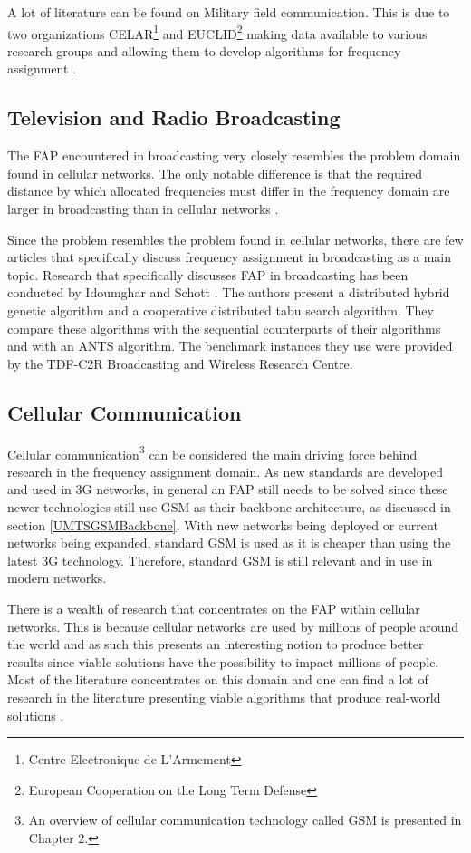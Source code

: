 A lot of literature can be found on Military field communication. This is due to two organizations CELAR\footnote{Centre Electronique de L'Armement} and EUCLID\footnote{European Cooperation on the Long Term Defense} making data available to various research groups and allowing them to develop algorithms for frequency assignment \cite{CALMA,DynamicFAP}. 

\subsection{Television and Radio Broadcasting}
The FAP encountered in broadcasting very closely resembles the problem domain found in cellular networks. The only notable difference is that the required distance by which allocated frequencies must differ in the frequency domain are larger in broadcasting than in cellular networks \cite{Karen2004}.

Since the problem resembles the problem found in cellular networks, there are few articles that specifically discuss frequency assignment in broadcasting as a main topic. Research that specifically discusses FAP in broadcasting has been conducted by Idoumghar and Schott \cite{RadioFAP}. The authors present a distributed hybrid genetic algorithm and a cooperative distributed tabu search algorithm. They compare these algorithms with the sequential counterparts of their algorithms and with an ANTS algorithm. The benchmark instances they use were provided by the TDF-C2R Broadcasting and Wireless Research Centre.
\subsection{Cellular Communication}
Cellular communication\footnote{An overview of cellular communication technology called GSM is presented in Chapter 2.} can be considered the main driving force behind research in the frequency assignment domain. As new standards are developed and used in 3G networks, in general an FAP still needs to be solved since these newer technologies still use GSM as their backbone architecture, as discussed in section \ref{UMTSGSMBackbone}. With new networks being deployed or current networks being expanded, standard GSM is used as it is cheaper than using the latest 3G technology. Therefore, standard GSM is still relevant and in use in modern networks.

There is a wealth of research that concentrates on the FAP within cellular networks. This is because cellular networks are used by millions of people around the world and as such this presents an interesting notion to produce better results since viable solutions have the possibility to impact millions of people. Most of the literature concentrates on this domain and one can find a lot of research in the literature presenting viable algorithms that produce real-world solutions \cite{Eisenblatter}. 

